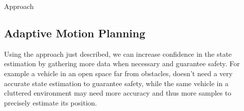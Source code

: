 \begin{section}{Approach}


\subsection{Adaptive Motion Planning}


Using the approach just  described, we can increase confidence in the state estimation by gathering more data when necessary and guarantee safety. For example a vehicle in an open space far from obstacles, doesn't need a very accurate state estimation to guarantee safety, while the same vehicle in a cluttered environment may need more accuracy and thus more samples to precisely estimate its position.


\end{section}

